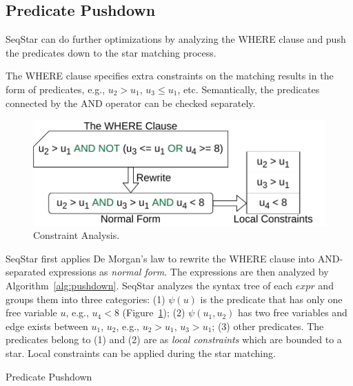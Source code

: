 \subsection{Predicate Pushdown}\label{sec:match_optimize}
SeqStar can do further optimizations by analyzing the WHERE clause and push the predicates down to the star matching process.

The WHERE clause specifies extra constraints on the matching results in the form of predicates,
e.g., $u_2 > u_1$, $u_3 \le u_1$, etc.
Semantically, the predicates connected by the AND operator can be checked separately.

\begin{figure}[ht]
  \centering
  \includegraphics[width=.4\textwidth]{img/constraints.pdf}
  \caption{Constraint Analysis.}\label{img:constraints}
\end{figure}

SeqStar first applies De Morgan's law to rewrite the WHERE clause into AND-separated expressions as \emph{normal form}.
The expressions are then analyzed by Algorithm~\ref{alg:pushdown}.
SeqStar analyzes the syntax tree of each $expr$ and groups them into three categories:
(1) $\psi(u)$ is the predicate that has only one free variable $u$, e.g., $u_4 < 8$ (Figure~\ref{img:constraints});
(2) $\psi(u_1, u_2)$ has two free variables and edge exists between $u_1$, $u_2$, e.g., $u_2 > u_1$, $u_3 > u_1$;
(3) other predicates.
The predicates belong to (1) and (2) are as \emph{local constraints} which are bounded to a star. 
Local constraints can be applied during the star matching.

\begin{algorithm}[ht]
  \caption{Predicate Pushdown}\label{alg:pushdown}
\end{algorithm}

